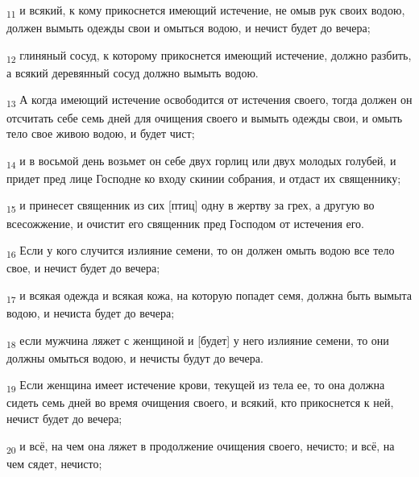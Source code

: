 \begin{tcolorbox}
\textsubscript{11} и всякий, к кому прикоснется имеющий истечение, не омыв рук своих водою, должен вымыть одежды свои и омыться водою, и нечист будет до вечера;
\end{tcolorbox}
\begin{tcolorbox}
\textsubscript{12} глиняный сосуд, к которому прикоснется имеющий истечение, должно разбить, а всякий деревянный сосуд должно вымыть водою.
\end{tcolorbox}
\begin{tcolorbox}
\textsubscript{13} А когда имеющий истечение освободится от истечения своего, тогда должен он отсчитать себе семь дней для очищения своего и вымыть одежды свои, и омыть тело свое живою водою, и будет чист;
\end{tcolorbox}
\begin{tcolorbox}
\textsubscript{14} и в восьмой день возьмет он себе двух горлиц или двух молодых голубей, и придет пред лице Господне ко входу скинии собрания, и отдаст их священнику;
\end{tcolorbox}
\begin{tcolorbox}
\textsubscript{15} и принесет священник из сих [птиц] одну в жертву за грех, а другую во всесожжение, и очистит его священник пред Господом от истечения его.
\end{tcolorbox}
\begin{tcolorbox}
\textsubscript{16} Если у кого случится излияние семени, то он должен омыть водою все тело свое, и нечист будет до вечера;
\end{tcolorbox}
\begin{tcolorbox}
\textsubscript{17} и всякая одежда и всякая кожа, на которую попадет семя, должна быть вымыта водою, и нечиста будет до вечера;
\end{tcolorbox}
\begin{tcolorbox}
\textsubscript{18} если мужчина ляжет с женщиной и [будет] у него излияние семени, то они должны омыться водою, и нечисты будут до вечера.
\end{tcolorbox}
\begin{tcolorbox}
\textsubscript{19} Если женщина имеет истечение крови, текущей из тела ее, то она должна сидеть семь дней во время очищения своего, и всякий, кто прикоснется к ней, нечист будет до вечера;
\end{tcolorbox}
\begin{tcolorbox}
\textsubscript{20} и всё, на чем она ляжет в продолжение очищения своего, нечисто; и всё, на чем сядет, нечисто;
\end{tcolorbox}
